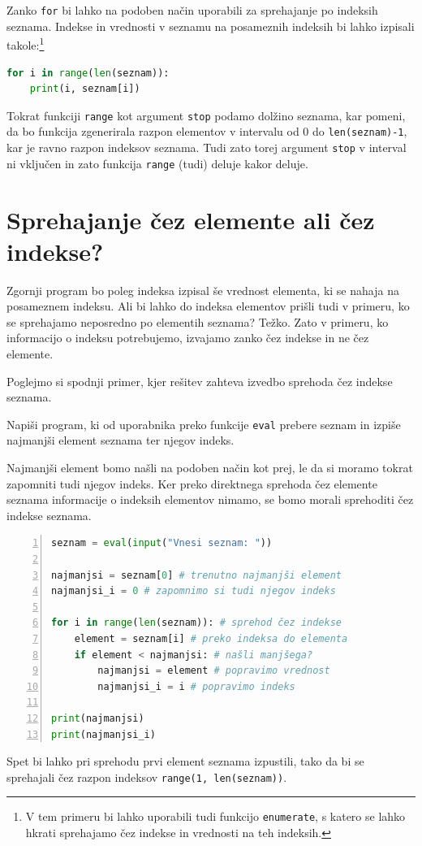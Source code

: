 Zanko \texttt{for} bi lahko na podoben način uporabili za sprehajanje po indeksih seznama. Indekse in vrednosti v seznamu na posameznih indeksih bi lahko izpisali takole:\footnote{V tem primeru bi lahko uporabili tudi funkcijo \texttt{enumerate}, s katero se lahko hkrati sprehajamo čez indekse in vrednosti na teh indeksih.}
\begin{lstlisting}[language=Python]
for i in range(len(seznam)):
    print(i, seznam[i])
\end{lstlisting}
Tokrat funkciji \texttt{range} kot argument \texttt{stop} podamo dolžino seznama, kar pomeni, da bo funkcija zgenerirala razpon elementov v intervalu od 0 do \texttt{len(seznam)-1}, kar je ravno razpon indeksov seznama. Tudi zato torej argument \texttt{stop} v interval ni vključen in zato funkcija \texttt{range} (tudi) deluje kakor deluje.

\section{Sprehajanje čez elemente ali čez indekse?}
Zgornji program bo poleg indeksa izpisal še vrednost elementa, ki se nahaja na posameznem indeksu. Ali bi lahko do indeksa elementov prišli tudi v primeru, ko se sprehajamo neposredno po elementih seznama? Težko. Zato v primeru, ko informacijo o indeksu potrebujemo, izvajamo zanko čez indekse in ne čez elemente.  

Poglejmo si spodnji primer, kjer rešitev zahteva izvedbo sprehoda čez indekse seznama.
\begin{zgled}
Napiši program, ki od uporabnika preko funkcije \texttt{eval} prebere seznam in izpiše najmanjši element seznama ter njegov indeks. 
\end{zgled}
\begin{resitev}
Najmanjši element bomo našli na podoben način kot prej, le da si moramo tokrat zapomniti tudi njegov indeks. Ker preko direktnega sprehoda čez elemente seznama informacije o indeksih elementov nimamo, se bomo morali sprehoditi čez indekse seznama.
\begin{lstlisting}[language=Python,numbers=left]
seznam = eval(input("Vnesi seznam: "))

najmanjsi = seznam[0] # trenutno najmanjši element
najmanjsi_i = 0 # zapomnimo si tudi njegov indeks

for i in range(len(seznam)): # sprehod čez indekse
    element = seznam[i] # preko indeksa do elementa
    if element < najmanjsi: # našli manjšega?
        najmanjsi = element # popravimo vrednost
        najmanjsi_i = i # popravimo indeks

print(najmanjsi)
print(najmanjsi_i)
\end{lstlisting}
Spet bi lahko pri sprehodu prvi element seznama izpustili, tako da bi se sprehajali čez razpon indeksov \texttt{range(1, len(seznam))}.
\end{resitev}

